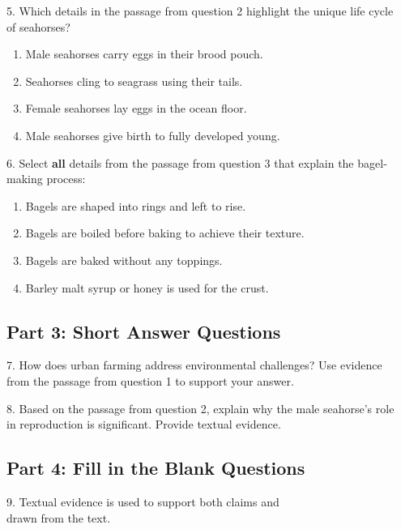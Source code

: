 \documentclass[12pt]{article}
\begin{document}
\vspace{1cm}

5. Which details in the passage from question 2 highlight the unique life cycle \\of seahorses?  
\begin{enumerate}[label=\Alph*.]
    \item Male seahorses carry eggs in their brood pouch.  
    \item Seahorses cling to seagrass using their tails.  
    \item Female seahorses lay eggs in the ocean floor.  
    \item Male seahorses give birth to fully developed young.  
\end{enumerate}

\vspace{1cm}

6. Select \textbf{all} details from the passage from question 3 that explain the bagel-\\making process:  
\begin{enumerate}[label=\Alph*.]
    \item Bagels are shaped into rings and left to rise.  
    \item Bagels are boiled before baking to achieve their texture.  
    \item Bagels are baked without any toppings.  
    \item Barley malt syrup or honey is used for the crust.  
\end{enumerate}

\vspace{1cm}
\newpage
\subsection*{Part 3: Short Answer Questions}

7. How does urban farming address environmental challenges? Use evidence\\ from the passage from question 1 to support your answer.  
\vspace{4cm}

8. Based on the passage from question 2, explain why the male seahorse’s role \\in reproduction is significant. Provide textual evidence.  
\vspace{4cm}

\subsection*{Part 4: Fill in the Blank Questions}
\vspace{1cm}
9. Textual evidence is used to support both \underline{\hspace{4cm}} claims and\\ \underline{\hspace{4cm}} drawn from the text.  
\vspace{2cm}
\end{document}
